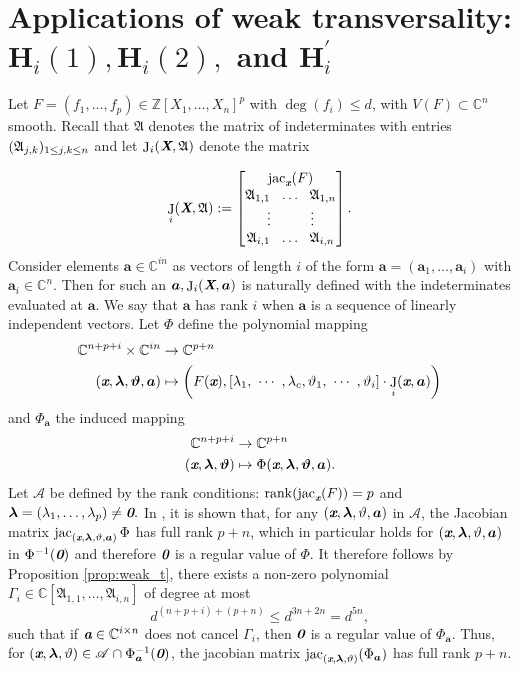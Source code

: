 \documentclass[a4paper]{article}
\def\sA{\mathscr{A}}
\def\A{\mathfrak{A}}
\def\bz{\textit{\textbf{0}}}
\def\Xb{\textit{\textbf{X}}}
\def\xb{\textit{\textbf{x}}}
\def\ab{\textit{\textbf{a}}}
\def\vt{\vartheta}
\DeclareMathOperator{\J}{J}
\DeclareMathOperator{\jac}{jac}
\DeclareMathOperator{\rk}{rank}
\newcommand{\ZZ}{{\mathbb{Z}}}
\def\C{\mathbb{C}}
\def\bbm{\begin{bmatrix}}
\def\ebm{\end{bmatrix}}
\begin{document}
\section{Applications of weak transversality: $\textbf{H}_i(1), \textbf{H}_i(2),$ and $\textbf{H}_i^{'}$}\label{sec:5}

Let $F=(f_1,\hdots,f_p) \in \ZZ[X_1,\hdots,X_n]^p$ with $\deg(f_i)\leq d$, with $V(F)
\subset \C^n$ smooth. Recall that $\A$ denotes the matrix of indeterminates with entries $(\frak
A_{j,k})_{1\le j,k \le n}$ and let $\J_i(\Xb,\A)$ denote the matrix
    
    \[
    \J_i(\Xb,\A) := 
    \bbm 
    \jac_{\xb}(F)\\
    \A_{1,1}~~ \hdots ~~\A_{1,n}\\
    \vdots\hspace{10mm}\vdots\\
     \A_{i,1}~~ \hdots ~~\A_{i,n}
     \ebm.
    \]
Consider elements $\bm a \in \C^{in}$ as vectors of length $i$ of the form $\bm a = (\bm a_1,\hdots,\bm a_i)$ with $\bm a_i \in \C^n$. Then for such an $\bm a, \J_i(\Xb,\bm a)$ is naturally defined with the indeterminates evaluated at $\bm a$. We say that $\bm a$ has rank $i$ when $\bm a$ is a sequence of linearly independent vectors. Let $\Phi$ define the polynomial mapping
    \begin{align*}
    \C^{n+p+i}\times \C^{i n} &\rightarrow \C^{p+n}\\
    (\xb,\bm \lambda,\bm \vt, \bm a)&
    \mapsto
    \left(F(\xb),[\lambda_1, ~\cdots~, \lambda_c, \vt_1, ~\cdots~, \vt_i ] \cdot 
    \J_i(\xb,\bm a)
    \right)
    \end{align*}
    and $\Phi_{\bm a}$ the induced mapping   
    \begin{align*}
    \C^{n+p+i} &\rightarrow \C^{p+n}\\
    (\xb,\bm \lambda,\bm \vt)&\mapsto \Phi(\xb,\bm \lambda,\bm \vt,\bm a).
    \end{align*}
    Let $\sA$ be defined by the rank conditions: $\rk (\jac_{\xb}(F))=p$ and $\bm \lambda=(\lambda_1,\hdots,\lambda_p) \not = \bz.$ In \cite[Section 3.2]{BaGiHeSaSh10}, it is shown that, for any $(\xb, \bm \lambda, \vt, \bm a)$ in $\sA$, the Jacobian matrix $\jac_{(\xb, \bm \lambda, \vt, \bm a)}\Phi$ has full rank $p + n$, which in particular holds for $(\xb, \bm \lambda, \vt, \bm a)$ in $\Phi^{-1}(\bz)$ and therefore $\bz$ is a regular value of $\Phi.$ It therefore follows by Proposition \ref{prop:weak_t}, there exists a non-zero polynomial $\Gamma_i \in \C[\A_{1,1},\hdots,\A_{i,n}]$ of degree at most 
    \[
    d^{(n+p+i)+(p+n)} \leq d^{3n+2n} = d^{5n},
    \]
    such that if $\ab \in \C^{i \times n}$ does not cancel $\Gamma_i$, then $\bz$ is a regular value of $\Phi_{\bm a}.$ Thus, for $(\xb, \bm \lambda, \vt) \in \sA \cap \Phi^{-1}_{\bm a}(\bz)$, the jacobian matrix $\jac_{(\xb, \bm \lambda, \vt)}(\Phi_{\bm a})$ has full rank $p+n$.  
    
\end{document}
